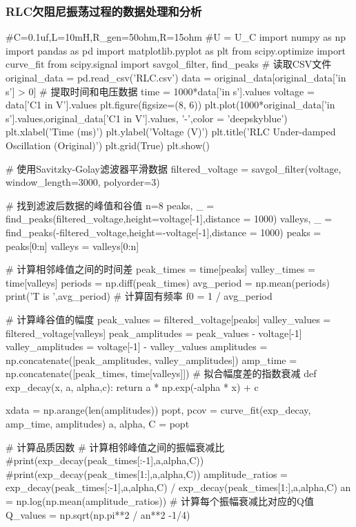 \documentclass[UTF8]{ctexart}
\begin{document}
\subsubsection{RLC欠阻尼振荡过程的数据处理和分析}
\begin{python}
#C=0.1uf,L=10mH,R_gen=50ohm,R=15ohm
#U = U_C
import numpy as np
import pandas as pd
import matplotlib.pyplot as plt
from scipy.optimize import curve_fit
from scipy.signal import savgol_filter, find_peaks
# 读取CSV文件
original_data = pd.read_csv('RLC.csv')  
data = original_data[original_data['in s'] > 0]
# 提取时间和电压数据
time = 1000*data['in s'].values
voltage = data['C1 in V'].values
plt.figure(figsize=(8, 6))
plt.plot(1000*original_data['in s'].values,original_data['C1 in V'].values, '-',color = 'deepskyblue')
plt.xlabel('Time (ms)')
plt.ylabel('Voltage (V)')
plt.title('RLC Under-damped Oscillation (Original)')
plt.grid(True)
plt.show()

# 使用Savitzky-Golay滤波器平滑数据
filtered_voltage = savgol_filter(voltage, window_length=3000, polyorder=3)


# 找到滤波后数据的峰值和谷值
n=8
peaks, _ = find_peaks(filtered_voltage,height=voltage[-1],distance = 1000)
valleys, _ = find_peaks(-filtered_voltage,height=-voltage[-1],distance = 1000)
peaks = peaks[0:n]
valleys = valleys[0:n]

# 计算相邻峰值之间的时间差
peak_times = time[peaks]
valley_times = time[valleys]
periods = np.diff(peak_times)
avg_period = np.mean(periods)
print('T is ',avg_period)
# 计算固有频率
f0 = 1 / avg_period

# 计算峰谷值的幅度
peak_values = filtered_voltage[peaks]
valley_values = filtered_voltage[valleys]
peak_amplitudes = peak_values - voltage[-1]
valley_amplitudes =  voltage[-1] - valley_values
amplitudes = np.concatenate([peak_amplitudes, valley_amplitudes])
amp_time = np.concatenate([peak_times, time[valleys]]) 
# 拟合幅度差的指数衰减
def exp_decay(x, a, alpha,c):
    return a * np.exp(-alpha * x) + c

xdata = np.arange(len(amplitudes))
popt, pcov = curve_fit(exp_decay, amp_time, amplitudes)
a, alpha, C = popt



# 计算品质因数
# 计算相邻峰值之间的振幅衰减比
#print(exp_decay(peak_times[:-1],a,alpha,C))
#print(exp_decay(peak_times[1:],a,alpha,C))
amplitude_ratios = exp_decay(peak_times[:-1],a,alpha,C) / exp_decay(peak_times[1:],a,alpha,C)
an = np.log(np.mean(amplitude_ratios))
# 计算每个振幅衰减比对应的Q值
Q_values = np.sqrt(np.pi**2 / an**2 -1/4)




\end{python}
\end{document}

